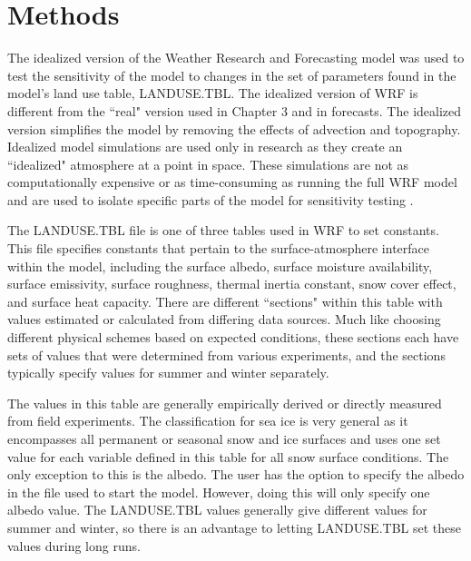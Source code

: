 \section{Methods}
The idealized version of the Weather Research and Forecasting model \citep{skamarock:2019} was used to test the sensitivity of the model to changes in the set of parameters found in the model's land use table, LANDUSE.TBL. The idealized version of WRF is different from the ``real" version used in Chapter 3 and in forecasts. The idealized version simplifies the model by removing the effects of advection and topography. Idealized model simulations are used only in research as they create an ``idealized" atmosphere at a point in space. These simulations are not as computationally expensive or as time-consuming as running the full WRF model and are used to isolate specific parts of the model for sensitivity testing \citep{arw:2019}. 

The LANDUSE.TBL file is one of three tables used in WRF to set constants. This file specifies constants that pertain to the surface-atmosphere interface within the model, including the surface albedo, surface moisture availability, surface emissivity, surface roughness, thermal inertia constant, snow cover effect, and surface heat capacity. There are different ``sections" within this table with values estimated or calculated from differing data sources. Much like choosing different physical schemes based on expected conditions, these sections each have sets of values that were determined from various experiments, and the sections typically specify values for summer and winter separately. 

The values in this table are generally empirically derived or directly measured from field experiments. The classification for sea ice is very general as it encompasses all permanent or seasonal snow and ice surfaces and uses one set value for each variable defined in this table for all snow surface conditions. The only exception to this is the albedo. The user has the option to specify the albedo in the file used to start the model. However, doing this will only specify one albedo value. The LANDUSE.TBL values generally give different values for summer and winter, so there is an advantage to letting LANDUSE.TBL set these values during long runs. 


